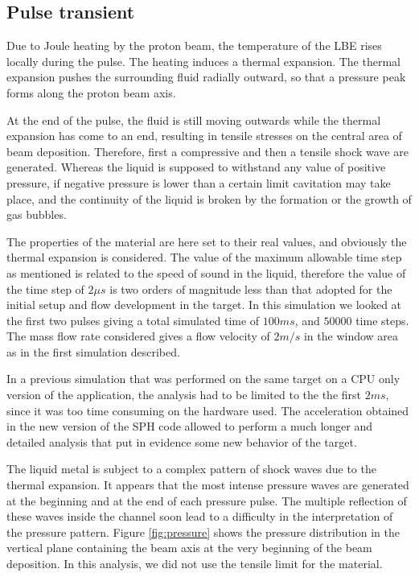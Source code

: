 \documentclass[a4paper, 11pt, twocolumn]{article}
\begin{document}
\subsection{Pulse transient}
Due to Joule heating by the proton beam, the temperature of the LBE rises locally during the pulse. The heating induces a thermal expansion. The thermal expansion pushes the surrounding fluid radially outward, so that a pressure peak forms along the proton beam axis. 

At the end of the pulse, the fluid is still moving outwards while the thermal expansion has come to an end, resulting in tensile stresses on the central area of beam deposition. Therefore, first a compressive and then a tensile shock wave are generated. Whereas the liquid is supposed to withstand any value of positive pressure, if negative pressure is lower than a certain limit cavitation may take place, and the continuity of the liquid is broken by the formation or the growth of gas bubbles.

The properties of the material are here set to their real values, and obviously the thermal expansion is considered. The value of the maximum allowable time step as mentioned is related to the speed of sound in the liquid, therefore the value of the time step of $2 \mu s$ is two orders of magnitude less than that adopted for the initial setup and flow development in the target. In this simulation we looked at the first two pulses giving a total simulated time of $100ms$, and $50000$ time steps. The mass flow rate considered gives a flow velocity of $2m/s$ in the window area as in the first simulation described.

In a previous simulation that was performed on the same target on a CPU only version of the application, the analysis had to be limited to the the first $2ms$, since it was too time consuming on the hardware used. The acceleration obtained in the new version of the SPH code allowed to perform a much longer and detailed analysis that put in evidence some new behavior of the target.

The liquid metal is subject to a complex pattern of shock waves due to the thermal expansion. It appears that the most intense pressure waves are generated at the beginning and at the end of each pressure pulse. The multiple reflection of these waves inside the channel soon lead to a difficulty in the interpretation of the pressure pattern. Figure \ref{fig:pressure} shows the pressure distribution in the vertical plane containing the beam axis at the very beginning of the beam deposition. In this analysis, we did not use the tensile limit for the material.
\end{document}
